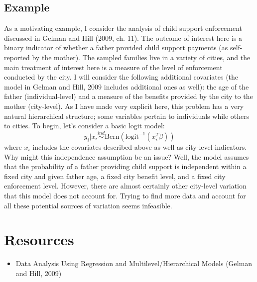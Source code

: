 \documentclass[12pt]{article}
\begin{document}
\subsection{Example}
As a motivating example, I consider the analysis of child support enforcement discussed in Gelman and Hill (2009, ch. 11). The outcome of interest here is a binary indicator of whether a father provided child
support payments (as self-reported by the mother). The sampled families live in a variety of cities, and the main treatment of interest here is a measure of the level of enforcement conducted by the city. I will 
consider the following additional covariates (the model in Gelman and Hill, 2009 includes additional ones as well): the age of the father (individual-level) and a measure of the benefits provided by the city to 
the mother (city-level). As I have made very explicit here, this problem has a very natural hierarchical structure; some variables pertain to individuals while others to cities. To begin, let's consider a basic logit 
model:
\[y_i|x_i \overset{ind}{\sim} \text{Bern}(\text{logit}^{-1}(x_i^T \beta)) \]
where $x_i$ includes the covariates described above as well as city-level indicators. Why might this independence assumption be an issue? Well, the model assumes that the probability of a father providing 
child support is independent within a fixed city and given father age, a fixed city benefit level, and a fixed city enforcement level. However, there are almost certainly other city-level variation that this model 
does not account for. Trying to find more data and account for all these potential sources of variation seems infeasible. 



\section{Resources}
\begin{itemize}
\item Data Analysis Using Regression and Multilevel/Hierarchical Models (Gelman and Hill, 2009)
\end{itemize}
\end{document}
